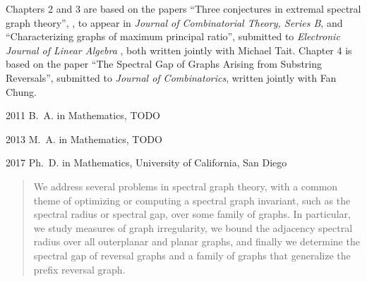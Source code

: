 \begin{frontmatter}
%
\tableofcontents
\listoffigures  %
\listoftables   %



%
%
\begin{acknowledgements}

Chapters 2 and 3 are based on the papers ``Three conjectures in extremal spectral graph theory'',
 \cite{TaitTobin2017}, to appear in \textit{Journal of Combinatorial Theory, Series B},
 and ``Characterizing graphs of maximum principal ratio'', submitted to
 \textit{Electronic Journal of Linear Algebra} \cite{TaitTobin2015},
 both written jointly with Michael Tait.
Chapter 4 is based on the paper ``The Spectral Gap of Graphs Arising from Substring Reversals'',
submitted to \textit{Journal of Combinatorics}, written jointly with Fan Chung.

\end{acknowledgements}


%
%
\begin{vitapage}
\begin{vita}
  \item[2011] B.~A. in Mathematics, TODO
  \item[2013] M.~A. in Mathematics, TODO
  \item[2017] Ph.~D. in Mathematics, University of California, San Diego
\end{vita}
\end{vitapage}


%
%
\begin{abstract}
 We address several problems in spectral graph theory, with a common theme of
 optimizing or computing a spectral graph invariant, such as the spectral radius or
 spectral gap, over some family of graphs.  In particular, we study
 measures of graph irregularity, we bound the adjacency spectral radius
 over all outerplanar and planar graphs, and finally we determine the spectral
 gap of reversal graphs and a family of graphs that generalize the
 prefix reversal graph.



\end{abstract}
\end{frontmatter}
